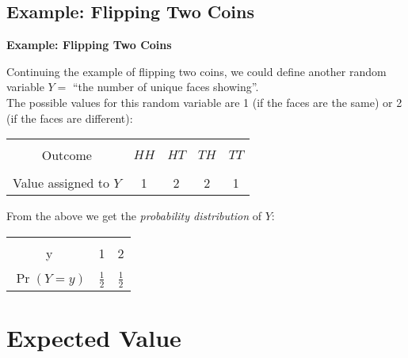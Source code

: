 \documentclass[compress]{beamer}        %
\makeatletter
\newcommand{\tcb}{\textcolor{beamer@blendedblue}}
\makeatother
\begin{document}
\subsection{Example: Flipping Two Coins}
\begin{frame}{\bf \tcb{Example: Flipping Two Coins}}

Continuing the example of flipping two coins, we could define another random variable $Y = $ ``the number of unique faces showing''.\\[0.3cm]
The possible values for this random variable are 1 (if the faces are the same) or 2 (if the faces are different):

\begin{center}
\begin{tabular}{|c|c|c|c|c|}
\hline
&&&&\\[-0.4cm]
Outcome  & $HH$ & $HT$ & $TH$ & $TT$ \\
\hline
&&&&\\[-0.4cm]
Value assigned to $Y$ & 1 & 2 & 2 & 1 \\
\hline
\end{tabular}
\end{center}

From the above we get the \emph{probability distribution} of $Y$:
\begin{center}
\begin{tabular}{|c|cc|}
\hline
&&\\[-0.4cm]
y & 1 & 2 \\
\hline
&&\\[-0.4cm]
$\Pr(Y=y)$ & $\frac{1}{2}$ & $\frac{1}{2}$ \\[0.1cm]
\hline
\end{tabular}
\end{center}



\end{frame}













\section{Expected Value}
\end{document}
